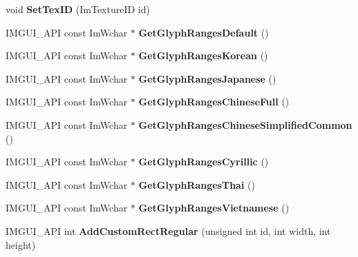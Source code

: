 \begin{DoxyCompactItemize}
\mbox{\label{structImFontAtlas_a96ffd1956c11dac4f79b43c095828445}} 
void {\bfseries Set\+Tex\+ID} (Im\+Texture\+ID id)
\item 
\mbox{\label{structImFontAtlas_adec0df140eb1dc01c2a22a5253d62820}} 
I\+M\+G\+U\+I\+\_\+\+A\+PI const Im\+Wchar $\ast$ {\bfseries Get\+Glyph\+Ranges\+Default} ()
\item 
\mbox{\label{structImFontAtlas_ac70e07bd35913661c8fc50413b3bf969}} 
I\+M\+G\+U\+I\+\_\+\+A\+PI const Im\+Wchar $\ast$ {\bfseries Get\+Glyph\+Ranges\+Korean} ()
\item 
\mbox{\label{structImFontAtlas_a2654afbbf73835bf08278cdc6c181a96}} 
I\+M\+G\+U\+I\+\_\+\+A\+PI const Im\+Wchar $\ast$ {\bfseries Get\+Glyph\+Ranges\+Japanese} ()
\item 
\mbox{\label{structImFontAtlas_ab32e8e79cc4f3b36ef447f70034e7c57}} 
I\+M\+G\+U\+I\+\_\+\+A\+PI const Im\+Wchar $\ast$ {\bfseries Get\+Glyph\+Ranges\+Chinese\+Full} ()
\item 
\mbox{\label{structImFontAtlas_a3a6b1a8afb01ba5e7c4d86957d6d2625}} 
I\+M\+G\+U\+I\+\_\+\+A\+PI const Im\+Wchar $\ast$ {\bfseries Get\+Glyph\+Ranges\+Chinese\+Simplified\+Common} ()
\item 
\mbox{\label{structImFontAtlas_a5aaff3357d9ed401ce451c39942e869e}} 
I\+M\+G\+U\+I\+\_\+\+A\+PI const Im\+Wchar $\ast$ {\bfseries Get\+Glyph\+Ranges\+Cyrillic} ()
\item 
\mbox{\label{structImFontAtlas_a4985c51d8a5270ff027f13fa44a14371}} 
I\+M\+G\+U\+I\+\_\+\+A\+PI const Im\+Wchar $\ast$ {\bfseries Get\+Glyph\+Ranges\+Thai} ()
\item 
\mbox{\label{structImFontAtlas_acc0e66fd4637600ad344c2f415a0ef60}} 
I\+M\+G\+U\+I\+\_\+\+A\+PI const Im\+Wchar $\ast$ {\bfseries Get\+Glyph\+Ranges\+Vietnamese} ()
\item 
\mbox{\label{structImFontAtlas_ac51952803d2205f28ca9fc996c5f6243}} 
I\+M\+G\+U\+I\+\_\+\+A\+PI int {\bfseries Add\+Custom\+Rect\+Regular} (unsigned int id, int width, int height)

\end{DoxyCompactItemize}
